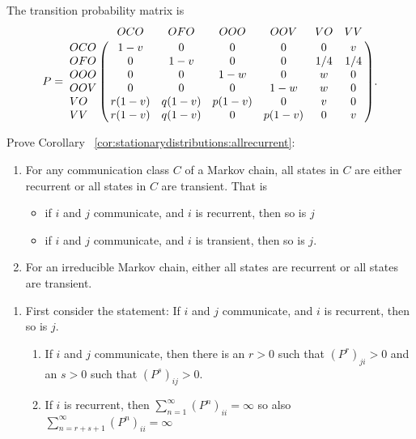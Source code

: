 \documentclass[12pt]{article}
\begin{document}
\begin{enumerate}
\begin{solution}
    The transition probability matrix is
    \[
        P= \bordermatrix{ & OCO & OFO & OOO & OOV & VO & VV \cr
        OCO & 1-v & 0 & 0 & 0 & 0 & v \cr
        OFO & 0 & 1-v & 0 & 0 & 1/4 & 1/4 \cr
        OOO & 0 & 0 & 1-w & 0 & w & 0 \cr
        OOV & 0 & 0 & 0 & 1-w & w & 0 \cr
        VO & r(1-v) & q(1-v) & p(1-v) & 0 & v & 0 \cr
        VV & r(1-v) & q(1-v) & 0 & p(1-v) & 0 & v \cr
        }.
    \]
\end{solution}

\begin{exercise}
    Prove Corollary~%
    \ref{cor:stationarydistributions:allrecurrent}:
    \begin{enumerate}
        \item
            For any communication class \( C \) of a Markov chain, all
            states in \( C \) are either recurrent or all states in \( C
            \) are transient.  That is
            \begin{itemize}
                \item
                    if \( i \) and \( j \) communicate, and \( i \) is
                    recurrent, then so is \( j \)
                \item
                    if \( i \) and \( j \) communicate, and \( i \) is
                    transient, then so is \( j \).
            \end{itemize}
        \item
            For an irreducible Markov chain, either all states are
            recurrent or all states are transient.
    \end{enumerate}
\end{exercise}
\begin{solution}
    \begin{enumerate}
        \item
            First consider the statement:  If \( i \) and \( j \)
            communicate, and \( i \) is recurrent, then so is \( j \).
            \begin{enumerate}
                \item
                    If \( i \) and \( j \) communicate, then there is an
                    \( r > 0 \) such that \( (P^r)_{ji} > 0 \) and an \(
                    s > 0 \) such that \( (P^s)_{ij} > 0 \).
                \item
                    If \( i \) is recurrent, then \( \sum_{n=1}^{\infty}
                    (P^n)_{ii} = \infty \) so also \( \sum_{n=r + s + 1}^
                    {\infty} (P^n)_{ii} = \infty \)

\end{enumerate}
\end{enumerate}
\end{solution}
\end{enumerate}
\end{document}

